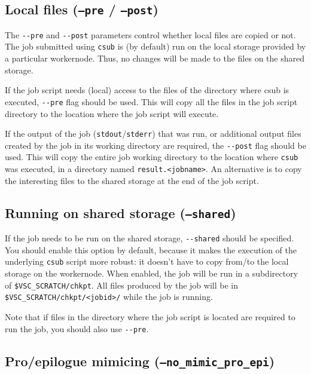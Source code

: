 \subsection{Local files (\texttt{--pre} / \texttt{--post})}

The \lstinline|--pre| and \lstinline|--post| parameters control whether local files
are copied or not. The job submitted using \lstinline|csub| is (by default) run on the local
storage provided by a particular workernode. Thus, no changes will be made to the
files on the shared storage.

If the job script needs (local) access to the files of the directory where csub
is executed, \lstinline|--pre| flag should be used. This will copy all the files in the job
script directory to the location where the job script will execute.

If the output of the job (\lstinline|stdout|/\lstinline|stderr|) that was run,
or additional output files created by the job in its working directory are required,
the \lstinline|--post| flag should be used. This will copy the entire job working directory
to the location where \lstinline|csub| was executed, in a directory named \lstinline|result.<jobname>|.
An alternative is to copy the interesting files to the shared storage at the end of the job script.


\subsection{Running on shared storage (\texttt{--shared})}

If the job needs to be run on the shared storage, \lstinline|--shared| should be specified.
You should enable this option by default, because it makes the execution of the
underlying \lstinline|csub| script more robust: it doesn't have to copy from/to
the local storage on the workernode. When enabled, the job will be run in a
subdirectory of \lstinline|$VSC_SCRATCH/chkpt|. All files produced by the job will
be in \lstinline|$VSC_SCRATCH/chkpt/<jobid>/| while the job is running.

Note that if files in the directory where the job script is located are required to
run the job, you should also use \lstinline|--pre|.

\subsection{Pro/epilogue mimicing (\texttt{--no\_mimic\_pro\_epi})}

